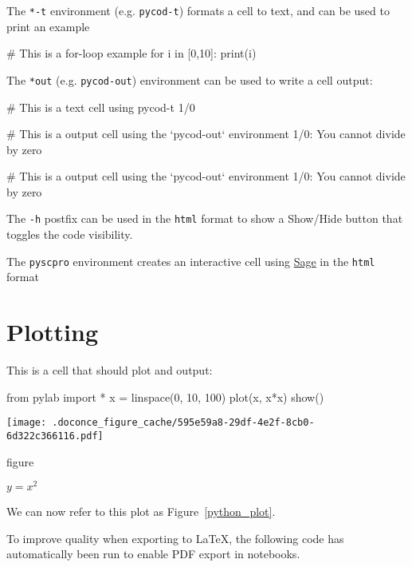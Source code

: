 \documentclass[%
oneside,                 %
final,                   %
chapterprefix=true,      %
open=right,              %
10pt]{book}
\begin{document}
The \texttt{*-t} environment (e.g. \texttt{pycod-t}) formats a cell to text, and can be used to print an example




\bpycod
# This is a for-loop example
for i in [0,10]:
  print(i)

\epycod


The \texttt{*out}  (e.g. \texttt{pycod-out}) environment can be used to write a cell output:



\bpycod
# This is a text cell using pycod-t
1/0

\epycod




\bpy
# This is a output cell using the `pycod-out` environment
1/0: You cannot divide by zero

\epy

\bpy
# This is a output cell using the `pycod-out` environment
1/0: You cannot divide by zero
\epy

The \texttt{-h} postfix can be used in the \texttt{html} format to show a Show/Hide button that toggles the code visibility.

The \texttt{pyscpro} environment creates an interactive cell using \href{{https://github.com/sagemath/sagecell/}}{Sage} in the \texttt{html} format

\section{Plotting}

This is a cell that should plot and output:






\bpycod
from pylab import *
x = linspace(0, 10, 100)
plot(x, x*x)
show()

\epycod

\begin{center}
   \texttt{[image: .doconce\_figure\_cache/595e59a8-29df-4e2f-8cb0-6d322c366116.pdf]}
   \caption{figure}{$y=x^2$}
   \label{python_plot}
\end{center}




We can now refer to this plot as Figure~\ref{python_plot}.

To improve quality when exporting to {\LaTeX}, the following code has automatically
been run to enable PDF export in notebooks.
\end{document}
